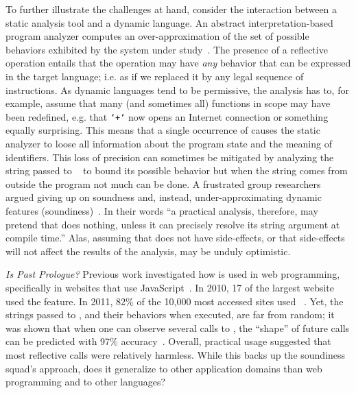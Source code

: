 \documentclass[USenglish,cleveref, autoref, thm-restate]{lipics-v2019}
\begin{document}
To further illustrate the challenges at hand, consider the interaction
between a static analysis tool and a dynamic language. An abstract
interpretation-based program analyzer computes an over-approximation
of the set of possible behaviors exhibited by the system under
study~\cite{cc77}. The presence of a reflective operation entails that
the operation may have \emph{any} behavior that can be expressed in
the target language; i.e. as if we replaced it by any legal sequence
of instructions.  As dynamic languages tend to be permissive, the
analysis has to, for example, assume that many (and sometimes all)
functions in scope may have been redefined, e.g. that \texttt{`+`} now
opens an Internet connection or something equally surprising. This
means that a single occurrence of \eval causes the static analyzer to
loose all information about the program state and the meaning of
identifiers. This loss of precision can sometimes be mitigated by
analyzing the string passed to \eval~\cite{} to bound its possible
behavior but when the string comes from outside the program not much
can be done.  A frustrated group researchers argued giving up on
soundness and, instead, under-approximating dynamic
features (soundiness)~\cite{soundy}. In their words ``a practical analysis,
therefore, may pretend that \eval does nothing, unless it can
precisely resolve its string argument at compile time.''  Alas,
assuming that \eval does not have side-effects, or that side-effects
will not affect the results of the analysis, may be unduly optimistic.

\vspace{2mm}\noindent\emph{Is Past Prologue?} Previous work
investigated how \eval is used in web programming, specifically in
websites that use JavaScript~\cite{pldi10a}. In 2010, 17 of the
largest website used the feature. In 2011, 82\% of the 10,000 most
accessed sites used \eval~\cite{ecoop11}.  Yet, the strings passed to
\eval, and their behaviors when executed, are far from random; it was
shown that when one can observe several calls to \eval, the ``shape''
of future calls can be predicted with 97\% accuracy~\cite{oopsla12b}.
Overall, practical usage suggested that most reflective calls were
relatively harmless. While this backs up the soundiness squad's
approach, does it generalize to other application domains than web
programming and to other languages?
\end{document}

